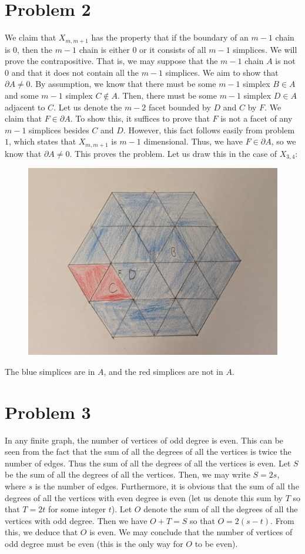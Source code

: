 \documentclass[12pt]{article}
\begin{document}
\section*{Problem 2}
We claim that $X_{m,m+1}$ has the property that if the boundary of an $m-1$ chain is $0$, then the $m-1$ chain is either $0$ or it consists of all $m-1$ simplices. We will prove the contrapositive. That is, we may suppose that the $m-1$ chain $A$ is not $0$ and that it does not contain all the $m-1$ simplices. We aim to show that $\partial{A} \neq 0$. By assumption, we know that there must be some $m-1$ simplex $B \in A$ and some $m-1$ simplex $C \not \in A$. Then, there must be some $m-1$ simplex $D \in A$ adjacent to $C$. Let us denote the $m-2$ facet bounded by $D$ and $C$ by $F$. We claim that $F \in \partial{A}$. To show this, it suffices to prove that $F$ is not a facet of any $m-1$ simplices besides $C$ and $D$. However, this fact follows easily from problem $1$, which states that $X_{m,m+1}$ is $m-1$ dimensional. Thus, we have $F \in \partial{A}$, so we know that $\partial{A} \neq 0$. This proves the problem. Let us draw this in the case of $X_{3,4}$:
\begin{figure}[H]
\centering
\includegraphics[width=\textwidth]{Image1}
\end{figure}
\noindent The blue simplices are in $A$, and the red simplices are not in $A$.
\newpage
\section*{Problem 3}
In any finite graph, the number of vertices of odd degree is even. This can be seen from the fact that the sum of all the degrees of all the vertices is twice the number of edges. Thus the sum of all the degrees of all the vertices is even. Let $S$ be the sum of all the degrees of all the vertices. Then, we may write $S = 2s$, where $s$ is the number of edges. Furthermore, it is obvious that the sum of all the degrees of all the vertices with even degree is even (let us denote this sum by $T$ so that $T = 2t$ for some integer $t$). Let $O$ denote the sum of all the degrees of all the vertices with odd degree. Then we have $O + T = S$ so that $O = 2(s-t)$. 
From this, we deduce that $O$ is even. We may conclude that the number of vertices of odd degree must be even (this is the only way for $O$ to be even). 
\end{document}
